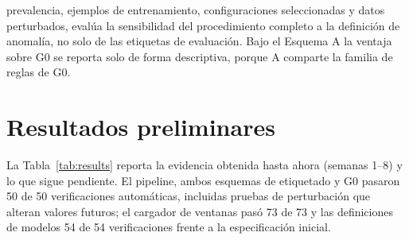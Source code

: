 \documentclass[conference]{IEEEtran}
\begin{document}
prevalencia, ejemplos de entrenamiento, configuraciones seleccionadas y datos
perturbados, eval\'ua la sensibilidad del procedimiento completo a la
definici\'on de anomal\'ia, no solo de las etiquetas de evaluaci\'on. Bajo el
Esquema A la ventaja sobre G0 se reporta solo de forma descriptiva, porque A
comparte la familia de reglas de G0.

\section{Resultados preliminares}

La Tabla~\ref{tab:results} reporta la evidencia obtenida hasta ahora
(semanas 1--8) y lo que sigue pendiente. El pipeline, ambos esquemas de
etiquetado y G0 pasaron 50 de 50 verificaciones autom\'aticas, incluidas
pruebas de perturbaci\'on que alteran valores futuros; el cargador de ventanas
pas\'o 73 de 73 y las definiciones de modelos 54 de 54 verificaciones frente a
la especificaci\'on inicial.
\end{document}
